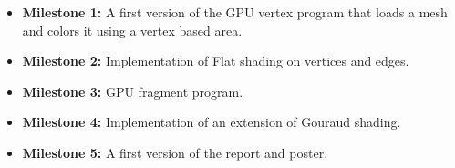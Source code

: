 \documentclass[11pt]{article}
\begin{document}
\begin{landscape}
\begin{itemize}
  \item [] \textbf{Milestone 1:} A first version of the GPU vertex program that loads a mesh and colors it using a vertex based area.
  \item [] \textbf{Milestone 2:} Implementation of Flat shading on vertices and edges.
  \item [] \textbf{Milestone 3:} GPU fragment program.
  \item [] \textbf{Milestone 4:} Implementation of an extension of Gouraud shading.
  \item [] \textbf{Milestone 5:} A first version of the report and poster.
\end{itemize}
\begin{flushright}\small{\color{gray!50}{The 15th week will be used only for possible delays or reviews.}  }\end{flushright}
\end{landscape}
\end{document}
